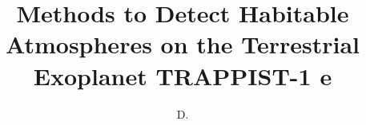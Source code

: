 \documentclass[defaultstyle,11pt]{apsthesis}
\title{Methods to Detect Habitable Atmospheres on the Terrestrial Exoplanet TRAPPIST-1 e}
\author{D.}{Gatlin}
\begin{document}








\nocite{*}		%

\appendix

\end{document}
